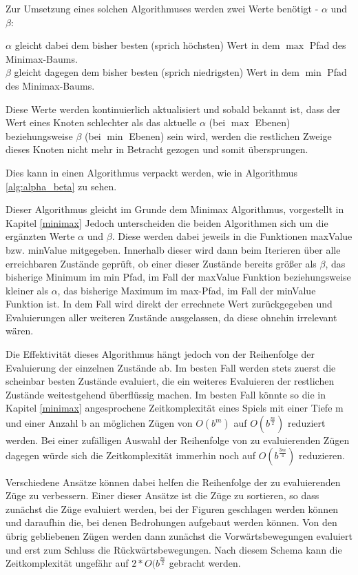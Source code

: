 Zur Umsetzung eines solchen Algorithmuses werden zwei Werte benötigt - $\alpha$ und $\beta$:

$\alpha$ gleicht dabei dem bisher besten (sprich höchsten) Wert in dem $\max$ Pfad des Minimax-Baums.\\
$\beta$ gleicht dagegen dem bisher besten (sprich niedrigsten) Wert in dem $\min$ Pfad des Minimax-Baums. \cite{Russell2010}

Diese Werte werden kontinuierlich aktualisiert und sobald bekannt ist, dass der Wert eines Knoten schlechter als das aktuelle $\alpha$ (bei $\max$ Ebenen) beziehungsweise $\beta$ (bei $\min$ Ebenen) sein wird, werden die restlichen Zweige dieses Knoten nicht mehr in Betracht gezogen und somit übersprungen. \cite{Russell2010}

Dies kann in einen Algorithmus verpackt werden, wie in Algorithmus \ref{alg:alpha_beta} zu sehen.

Dieser Algorithmus gleicht im Grunde dem Minimax Algorithmus, vorgestellt in Kapitel \ref{minimax} Jedoch unterscheiden die beiden Algorithmen sich um die ergänzten Werte $\alpha$ und $\beta$. Diese werden dabei jeweils in die Funktionen maxValue bzw. minValue mitgegeben. Innerhalb dieser wird dann beim Iterieren über alle erreichbaren Zustände geprüft, ob einer dieser Zustände bereits größer als $\beta$, das bisherige Minimum im min Pfad, im Fall der maxValue Funktion beziehungsweise kleiner als $\alpha$, das bisherige Maximum im max-Pfad, im Fall der minValue Funktion ist. In dem Fall wird direkt der errechnete Wert zurückgegeben und Evaluierungen aller weiteren Zustände ausgelassen, da diese ohnehin irrelevant wären.

Die Effektivität dieses Algorithmus hängt jedoch von der Reihenfolge der Evaluierung der einzelnen Zustände ab. Im besten Fall werden stets zuerst die scheinbar besten Zustände evaluiert, die ein weiteres Evaluieren der restlichen Zustände weitestgehend überflüssig machen. Im besten Fall könnte so die in Kapitel \ref{minimax} angesprochene Zeitkomplexität eines Spiels mit einer Tiefe m und einer Anzahl b an möglichen Zügen von $O(b^m)$ auf $O(b^\frac{m}{2})$ reduziert werden. Bei einer zufälligen Auswahl der Reihenfolge von zu evaluierenden Zügen dagegen würde sich die Zeitkomplexität immerhin noch auf $O(b^\frac{3m}{4})$ reduzieren. \cite{Russell2010}

Verschiedene Ansätze können dabei helfen die Reihenfolge der zu evaluierenden Züge zu verbessern. Einer dieser Ansätze ist die Züge zu sortieren, so dass zunächst die Züge evaluiert werden, bei der Figuren geschlagen werden können und daraufhin die, bei denen Bedrohungen aufgebaut werden können. Von den übrig gebliebenen Zügen werden dann zunächst die Vorwärtsbewegungen evaluiert und erst zum Schluss die Rückwärtsbewegungen. Nach diesem Schema kann die Zeitkomplexität ungefähr auf $2*O(b^\frac{m}{2}$ gebracht werden. \cite{Russell2010}

